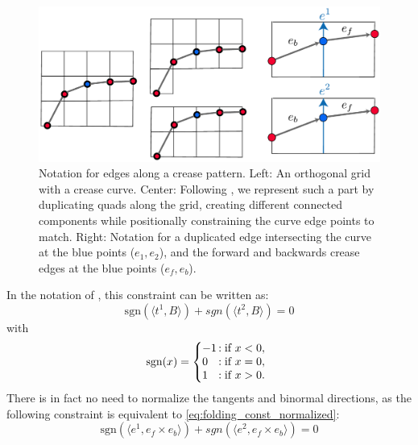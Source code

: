 \begin{figure} [h]
	\centering
	\includegraphics[width=\linewidth]{figures/osc_plane_discretization}
	\caption{Notation for edges along a crease pattern. Left: An orthogonal grid with a crease curve. Center: Following \cite{rabi2018shape}, we represent such a part by duplicating quads along the grid, creating different connected components while positionally constraining the curve edge points to match. Right: Notation for a duplicated edge intersecting the curve at the blue points ($e_1,e_2$), and the forward and backwards crease edges at the blue points ($e_f,e_b$). }
	\label{fig:osc_plane_discretization}
\end{figure}

In the notation of , this constraint can be written as:
\begin{equation} \label{eq:folding_const_normalized} 
\text{sgn}(\langle t^1,B\rangle) +  {sgn}(\langle t^2,B\rangle) = 0
\end{equation}
with 
\begin{equation} \label{eq:sign}
\text{sgn}(x) = \left\{
     \begin{array}{@{}l@{\thinspace}l}
       -1  &: \text{if } x < 0, \\
       0 &: \text{if } x = 0, \\
       1 &: \text{if } x > 0. \\
     \end{array}
   \right.
\end{equation}
There is in fact no need to normalize the tangents and binormal directions, as the following constraint is equivalent to \eqref{eq:folding_const_normalized}:
\begin{equation} \label{eq:folding_const}
\text{sgn}(\langle e^1,e_f \times e_b \rangle) +  {sgn}(\langle e^2,e_f \times e_b\rangle) = 0
\end{equation}
